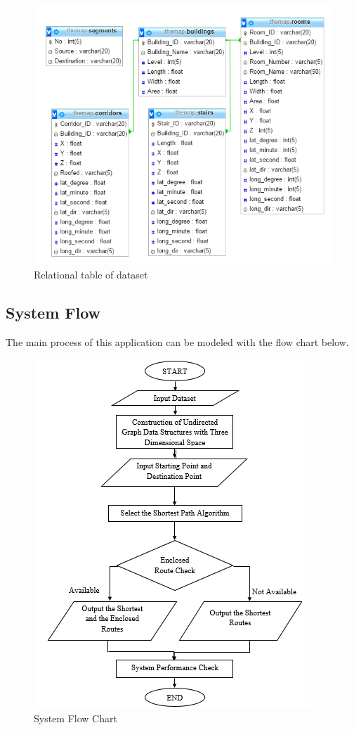 \begin{figure}[h!]
	\centering
	\includegraphics[scale=0.9]{figure13.png}
	\caption{Relational table of dataset}
	\label{fig:figure13}
\end{figure}

\vspace{60mm}

\subsection{System Flow}
The main process of this application can be modeled with the flow chart below.

\begin{figure}[h!]
	\centering
	\includegraphics[scale=1.4]{figure14.png}
	\caption{System Flow Chart}
	\label{fig:figure14}
\end{figure}

